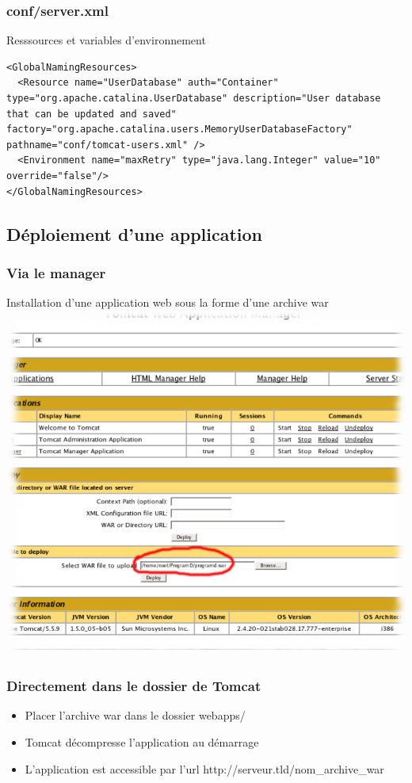 \begin{frame}[fragile]
  \frametitle{conf/server.xml}
		Resssources et variables d'environnement

        \begin{lstlisting}
<GlobalNamingResources>
  <Resource name="UserDatabase" auth="Container" type="org.apache.catalina.UserDatabase" description="User database that can be updated and saved" factory="org.apache.catalina.users.MemoryUserDatabaseFactory" pathname="conf/tomcat-users.xml" />
  <Environment name="maxRetry" type="java.lang.Integer" value="10" override="false"/>
</GlobalNamingResources>

        \end{lstlisting}
\end{frame}

\subsection{Déploiement d'une application}
\begin{frame}
\frametitle{Via le manager}
	Installation d'une application web sous la forme d'une archive war
  \includegraphics[scale=0.3]{Images/tomcat-deploy-war.png}
\end{frame}

\begin{frame}
  \frametitle{Directement dans le dossier de Tomcat}

  \begin{itemize}
    \item Placer l'archive war dans le dossier webapps/
    \item Tomcat décompresse l'application au démarrage
    \item L'application est accessible par l'url http://serveur.tld/nom\_archive\_war
  \end{itemize}
\end{frame}

